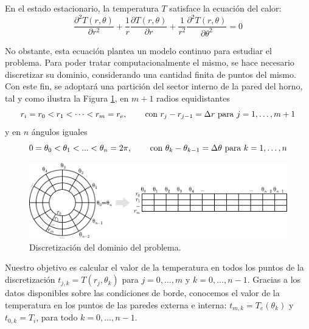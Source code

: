         En el estado estacionario, la temperatura $T$ satisface la ecuación del calor:
        \begin{equation} \label{eq:calor}
            \frac{\partial^2 T(r, \theta)}{\partial r^2} + \frac{1}{r} \frac{\partial T(r, \theta)}{\partial r} + \frac{1}{r^2} \frac{\partial^2 T(r, \theta)}{\partial \theta^2} = 0
        \end{equation}

        No obstante, esta ecuación plantea un modelo continuo para estudiar el problema. Para poder tratar computacionalmente el mismo, se hace necesario discretizar su dominio, considerando una cantidad finita de puntos del mismo. Con este fin, se adoptará una partición del sector interno de la pared del horno, tal y como ilustra la Figura \ref{fig:discretizacion}, en $m + 1$ radios equidistantes
        \[ r_i = r_0 < r_1 < \dots < r_m = r_e \text{, \qquad con } r_j - r_{j-1} = \Delta r \text{ para } j = 1, \dots, m+1 \]
        y en $n$ ángulos iguales
        \[ 0 = \theta_0 < \theta_1 < ... < \theta_n = 2\pi \text{, \qquad con } \theta_k - \theta_{k-1} = \Delta \theta \text{ para } k = 1, \dots, n \]

        \begin{figure}[h]
          \centering

          \includegraphics{imagenes/discretizacion.pdf}

          \caption{Discretización del dominio del problema.}
          \label{fig:discretizacion}
        \end{figure}

        Nuestro objetivo es calcular el valor de la temperatura en todos los puntos de la discretización $t_{j,k} = T(r_j, \theta_k)$ para $j = 0, \dots, m$ y $k = 0, \dots, n-1$. Gracias a los datos disponibles sobre las condiciones de borde, conocemos el valor de la temperatura en los puntos de las paredes externa e interna: $t_{m,k} = T_e(\theta_k)$ y $t_{0,k} = T_i$, para todo $k = 0, \dots, n-1$.

